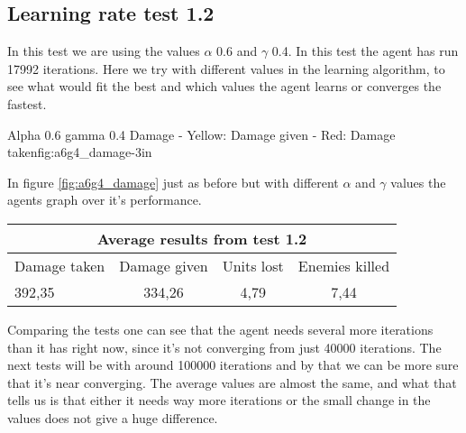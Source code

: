 \subsection*{Learning rate test 1.2}
In this test we are using the values $\alpha$ 0.6 and $\gamma$ 0.4. In this test the agent has run 17992 iterations. Here we try with different values in the learning algorithm, to see what would fit the best and which values the agent learns or converges the fastest.


			{Alpha 0.6 gamma 0.4 Damage - Yellow: Damage given - Red: Damage taken}{fig:a6g4_damage}{-3in}

In figure \ref{fig:a6g4_damage} just as before but with different $\alpha$ and $\gamma$ values the agents graph over it's performance.






\begin{centering}
 \begin{tabular}{|l|c|c|c|}
	\multicolumn{4}{c}{Average results from test 1.2} \\
	\hline
		Damage taken & Damage given & Units lost & Enemies killed\\
	\hline
		392,35 & 334,26 & 4,79 & 7,44 \\
	\hline
\end{tabular}
\label{test1.2}
\end{centering}





Comparing the tests one can see that the agent needs several more iterations than it has right now, since it's not converging from just 40000 iterations. The next tests will be with around 100000 iterations and by that we can be more sure that it's near converging. The average values are almost the same, and what that tells us is that either it needs way more iterations or the small change in the values does not give a huge difference.









